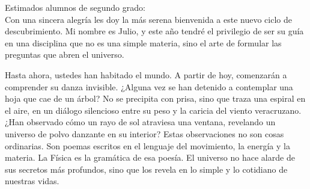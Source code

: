 \documentclass[11pt]{report}
\begin{document}
\begin{titlepage}




\vspace{0.7em}

\raggedright Estimados alumnos de segundo grado:\\

Con una sincera alegría les doy la más serena bienvenida a este nuevo ciclo de descubrimiento. Mi nombre es Julio, y este año tendré el privilegio de ser su guía en una disciplina que no es una simple materia, sino el arte de formular las preguntas que abren el universo.

\vspace{0.7em}

Hasta ahora, ustedes han habitado el mundo. A partir de hoy, comenzarán a comprender su danza invisible. ¿Alguna vez se han detenido a contemplar una hoja que cae de un árbol? No se precipita con prisa, sino que traza una espiral en el aire, en un diálogo silencioso entre su peso y la caricia del viento veracruzano. ¿Han observado cómo un rayo de sol atraviesa una ventana, revelando un universo de polvo danzante en su interior? Estas observaciones no son cosas ordinarias. Son poemas escritos en el lenguaje del movimiento, la energía y la materia. La Física es la gramática de esa poesía. El universo no hace alarde de sus secretos más profundos, sino que los revela en lo simple y lo cotidiano de nuestras vidas.


\end{titlepage}
\end{document}
